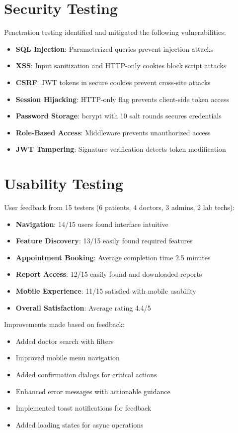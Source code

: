 \section{Security Testing}

Penetration testing identified and mitigated the following vulnerabilities:

\begin{itemize}
    \item \textbf{SQL Injection}: Parameterized queries prevent injection attacks
    \item \textbf{XSS}: Input sanitization and HTTP-only cookies block script attacks
    \item \textbf{CSRF}: JWT tokens in secure cookies prevent cross-site attacks
    \item \textbf{Session Hijacking}: HTTP-only flag prevents client-side token access
    \item \textbf{Password Storage}: bcrypt with 10 salt rounds secures credentials
    \item \textbf{Role-Based Access}: Middleware prevents unauthorized access
    \item \textbf{JWT Tampering}: Signature verification detects token modification
\end{itemize}

\section{Usability Testing}

User feedback from 15 testers (6 patients, 4 doctors, 3 admins, 2 lab techs):

\begin{itemize}
    \item \textbf{Navigation}: 14/15 users found interface intuitive
    \item \textbf{Feature Discovery}: 13/15 easily found required features
    \item \textbf{Appointment Booking}: Average completion time 2.5 minutes
    \item \textbf{Report Access}: 12/15 easily found and downloaded reports
    \item \textbf{Mobile Experience}: 11/15 satisfied with mobile usability
    \item \textbf{Overall Satisfaction}: Average rating 4.4/5
\end{itemize}

Improvements made based on feedback:
\begin{itemize}
    \item Added doctor search with filters
    \item Improved mobile menu navigation
    \item Added confirmation dialogs for critical actions
    \item Enhanced error messages with actionable guidance
    \item Implemented toast notifications for feedback
    \item Added loading states for async operations
\end{itemize}

